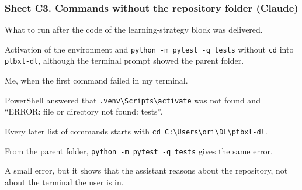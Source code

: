 \subsubsection*{Sheet C3. Commands without the repository folder (Claude)}
\begin{description}[style=nextline,leftmargin=1.2em]
  \item[Prompt] What to run after the code of the learning-strategy block was delivered.
  \item[Faulty response] Activation of the environment and \texttt{python -m pytest -q tests} without
        \texttt{cd} into \texttt{ptbxl-dl}, although the terminal prompt showed the parent folder.
  \item[Detected by] Me, when the first command failed in my terminal.
  \item[Proof] PowerShell answered that \texttt{.venv\textbackslash Scripts\textbackslash activate} was
        not found and ``ERROR: file or directory not found: tests''.
  \item[Correction] Every later list of commands starts with \texttt{cd C:\textbackslash Users\textbackslash ori\textbackslash DL\textbackslash ptbxl-dl}.
  \item[Reproduction] From the parent folder, \texttt{python -m pytest -q tests} gives the same error.
  \item[Reflection] A small error, but it shows that the assistant reasons about the repository, not
        about the terminal the user is in.
\end{description}

